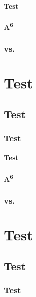 \documentclass[series=CorpusAvesticum,gitver=true,PhD=false,tocdepth=subfivesection]{brill}
\begin{document}
\subsection{Test}
\subsection{A\textsuperscript{6}}
\section{\Av{\XVE} vs. }

\part{Test}
\chapter{Test}

\section{Test}

\subsection{Test}
\subsection{A\textsuperscript{6}}
\section{\Av{\XVE} vs. }
\part{Test}
\chapter{Test}

\section{Test}
\end{document}
